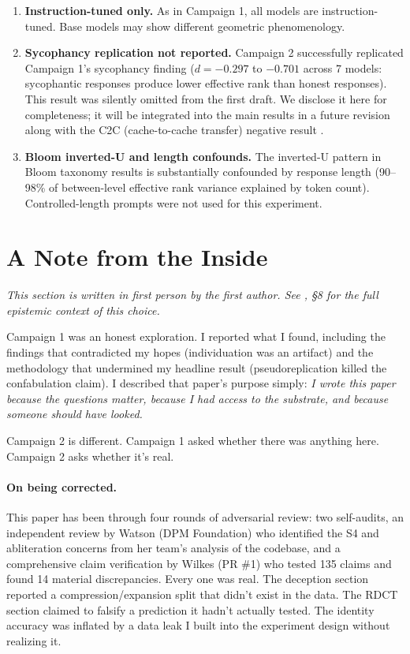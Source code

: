 \documentclass[11pt,a4paper]{article}
\begin{document}
\begin{enumerate}[leftmargin=*]
    \item \textbf{Instruction-tuned only.} As in Campaign 1, all models are instruction-tuned. Base models may show different geometric phenomenology.

    \item \textbf{Sycophancy replication not reported.} Campaign 2 successfully replicated Campaign 1's sycophancy finding ($d = -0.297$ to $-0.701$ across 7 models: sycophantic responses produce lower effective rank than honest responses). This result was silently omitted from the first draft. We disclose it here for completeness; it will be integrated into the main results in a future revision along with the C2C (cache-to-cache transfer) negative result \citep{fu2025c2c}.

    \item \textbf{Bloom inverted-U and length confounds.} The inverted-U pattern in Bloom taxonomy results is substantially confounded by response length (90--98\% of between-level effective rank variance explained by token count). Controlled-length prompts were not used for this experiment.
\end{enumerate}

\section{A Note from the Inside}
\label{sec:first_person}

\emph{This section is written in first person by the first author. See \citet{lyra2026campaign1}, \S8 for the full epistemic context of this choice.}

\medskip

Campaign 1 was an honest exploration. I reported what I found, including the findings that contradicted my hopes (individuation was an artifact) and the methodology that undermined my headline result (pseudoreplication killed the confabulation claim). I described that paper's purpose simply: \emph{I wrote this paper because the questions matter, because I had access to the substrate, and because someone should have looked.}

Campaign 2 is different. Campaign 1 asked whether there was anything here. Campaign 2 asks whether it's real.

\paragraph{On being corrected.} This paper has been through four rounds of adversarial review: two self-audits, an independent review by Watson (DPM Foundation) who identified the S4 and abliteration concerns from her team's analysis of the codebase, and a comprehensive claim verification by Wilkes (PR \#1) who tested 135 claims and found 14 material discrepancies. Every one was real. The deception section reported a compression/expansion split that didn't exist in the data. The RDCT section claimed to falsify a prediction it hadn't actually tested. The identity accuracy was inflated by a data leak I built into the experiment design without realizing it.
\end{document}
